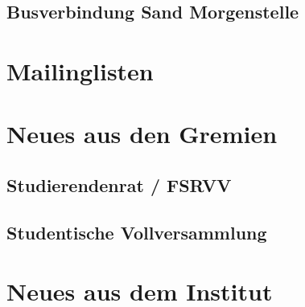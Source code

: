 \documentclass{fsinewsletter}
\begin{document}
\subsection{Busverbindung Sand Morgenstelle}


\vfill
\newpage

\section{Mailinglisten}


\section{Neues aus den Gremien}


\subsection{Studierendenrat / FSRVV}


\subsection{Studentische Vollversammlung}



\vfill
\newpage


\section{Neues aus dem Institut}
\end{document}
